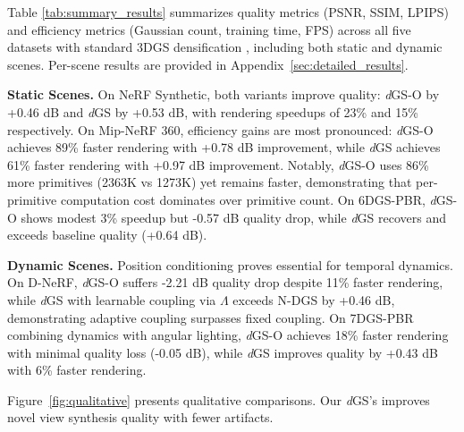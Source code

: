 \documentclass{article}
\theoremstyle{plain}
\theoremstyle{definition}
\theoremstyle{remark}
\begin{document}
Table \ref{tab:summary_results} summarizes quality metrics (PSNR, SSIM, LPIPS) and efficiency metrics (Gaussian count, training time, FPS) across all five datasets with standard 3DGS densification \citep{3dgs}, including both static and dynamic scenes. Per-scene results are provided in Appendix~\ref{sec:detailed_results}.

\textbf{Static Scenes.}
On NeRF Synthetic, both variants improve quality: \textit{d}GS-O by +0.46 dB and \textit{d}GS by +0.53 dB, with rendering speedups of 23\% and 15\% respectively. On Mip-NeRF 360, efficiency gains are most pronounced: \textit{d}GS-O achieves 89\% faster rendering with +0.78 dB improvement, while \textit{d}GS achieves 61\% faster rendering with +0.97 dB improvement. Notably, \textit{d}GS-O uses 86\% more primitives (2363K vs 1273K) yet remains faster, demonstrating that per-primitive computation cost dominates over primitive count. On 6DGS-PBR, \textit{d}GS-O shows modest 3\% speedup but -0.57 dB quality drop, while \textit{d}GS recovers and exceeds baseline quality (+0.64 dB).

\textbf{Dynamic Scenes.}
Position conditioning proves essential for temporal dynamics. On D-NeRF, \textit{d}GS-O suffers -2.21 dB quality drop despite 11\% faster rendering, while \textit{d}GS with learnable coupling via $\Lambda$ exceeds N-DGS by +0.46 dB, demonstrating adaptive coupling surpasses fixed coupling. On 7DGS-PBR combining dynamics with angular lighting, \textit{d}GS-O achieves 18\% faster rendering with minimal quality loss (-0.05 dB), while \textit{d}GS improves quality by +0.43 dB with 6\% faster rendering.

Figure~\ref{fig:qualitative} presents qualitative comparisons. Our \textit{d}GS's improves novel view synthesis quality with fewer artifacts.

\begin{table}[!t]
\centering
\caption{Ablation study on NeRF Synthetic and 6DGS-PBR datasets. \textit{d}GS w/o $\bar{s}$ means removing spatial scaling.}
\label{tab:ablation}
\setlength{\tabcolsep}{4pt}
%
\vspace{-1em}
\end{table}
\end{document}
